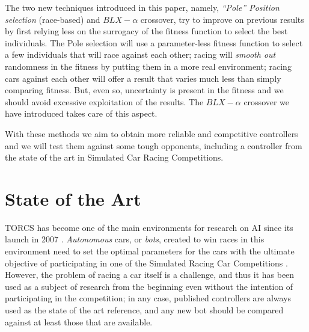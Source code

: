 \documentclass[10pt,journal,compsoc]{IEEEtran}
\begin{document}
The two new techniques introduced in this paper, namely, \textit{``Pole'' Position selection} (race-based) and $BLX-\alpha$ crossover, try to improve on previous results by first relying less on the surrogacy of the fitness function
to select the best individuals. The Pole selection will use a parameter-less fitness function to select a few individuals that will race against each other; racing will {\em smooth out} randomness in the fitness by putting them in a
more real environment; racing cars against each other will offer a
result that varies much less than simply comparing fitness. But, even
so, uncertainty is present in the fitness and we should avoid
excessive exploitation of the results. The $BLX-\alpha$ crossover we
have introduced takes care of this aspect.

With these methods we aim to obtain more reliable and competitive controllers and we will test them against some tough opponents, including a controller from the state of the art in Simulated Car Racing Competitions.



\section{State of the Art}
\label{sec:soa}

TORCS has become one of the main environments for research on AI since its launch in 2007 \cite{torcs4}. {\em Autonomous} cars, or {\em bots}, created to win races in this environment need to set the optimal parameters for the
cars \cite{Kole-ParamCarTunning12} with the ultimate objective of
participating in one of the Simulated Racing Car Competitions
\cite{SimulatedCarRacing-2008,SimulatedCarRacing-2010}. However, the
problem of racing a car itself is a challenge, and thus it has been used as a subject of research from the beginning even without the intention of
participating in the competition; in any case, published controllers
are always used as the state of the art reference, and any new bot
should be compared against at least those that are available.
\end{document}
